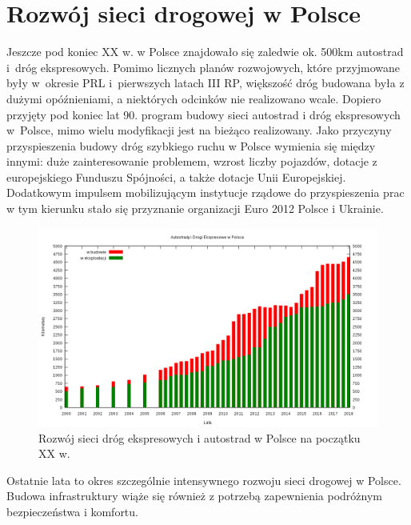\section{Rozwój sieci drogowej w Polsce}

Jeszcze pod koniec XX w. w Polsce znajdowało się zaledwie ok. 500km autostrad i~dróg ekspresowych. Pomimo licznych planów rozwojowych, które przyjmowane były w~okresie PRL i~pierwszych latach III RP, większość dróg budowana była z dużymi opóźnieniami, a niektórych odcinków nie realizowano wcale.\newline
Dopiero przyjęty pod koniec lat 90. program budowy sieci autostrad i dróg ekspresowych w~Polsce, mimo wielu modyfikacji jest na bieżąco realizowany. Jako przyczyny\cite{siec-drogowa-IIIrp} przyspieszenia budowy dróg szybkiego ruchu w Polsce wymienia się między innymi: duże zainteresowanie problemem, wzrost liczby pojazdów, dotacje z europejskiego Funduszu Spójności, a także dotacje Unii Europejskiej. Dodatkowym impulsem mobilizującym instytucje rządowe do przyspieszenia prac w tym kierunku stało się przyznanie organizacji Euro 2012 Polsce i Ukrainie.\newline
\begin{figure}[h]
\caption{Rozwój sieci dróg ekspresowych i autostrad w Polsce na początku XX w.}
\includegraphics[width=\textwidth]{images/1024px-PL-Motorways.png}
\end{figure} \newline
Ostatnie lata to okres szczególnie intensywnego rozwoju sieci drogowej w Polsce. Budowa infrastruktury wiąże się również z potrzebą zapewnienia podróżnym bezpieczeństwa i komfortu.
